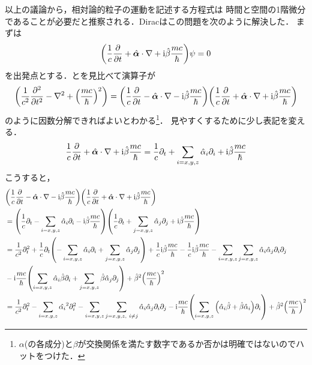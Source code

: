 \documentclass{report}
\begin{document}
以上の議論から，相対論的粒子の運動を記述する方程式は
時間と空間の1階微分であることが必要だと推察される．Diracはこの問題を次のように解決した．
まずは
\begin{align}
  \qty(\frac{1}{c}\frac{\partial}{\partial t} + \hat{\bm{\alpha}} \cdot \nabla + \mathrm{i}\hat{\beta} \frac{mc}{\hbar})\psi = 0 \label{Dirac-pre}
\end{align}
を出発点とする．とを見比べて演算子が
\begin{align}
  \qty(\frac{1}{c^2}\frac{\partial^2}{\partial t^2} - \nabla^2 + \qty(\frac{mc}{\hbar})^2) = \qty(\frac{1}{c}\frac{\partial}{\partial t} - \hat{\bm{\alpha}} \cdot \nabla - \mathrm{i}\hat{\beta} \frac{mc}{\hbar})\qty(\frac{1}{c}\frac{\partial}{\partial t} + \hat{\bm{\alpha}} \cdot \nabla + \mathrm{i}\hat{\beta} \frac{mc}{\hbar})
\end{align}
のように因数分解できればよいとわかる\footnote{$\alpha$(の各成分)と$\beta$が交換関係を満たす数字であるか否かは明確ではないのでハットをつけた．}．
見やすくするために少し表記を変える．
\begin{align}
  \frac{1}{c}\frac{\partial}{\partial t} + \hat{\bm{\alpha}} \cdot \nabla + \mathrm{i}\hat{\beta} \frac{mc}{\hbar} = \frac{1}{c}\partial_t + \sum_{i=x,y,z} \hat{\alpha}_i \partial_i + \mathrm{i}\hat{\beta} \frac{mc}{\hbar}
\end{align}
こうすると，
\begin{align}
  &\qty(\frac{1}{c}\frac{\partial}{\partial t} - \hat{\bm{\alpha}} \cdot \nabla - \mathrm{i}\hat{\beta} \frac{mc}{\hbar})\qty(\frac{1}{c}\frac{\partial}{\partial t} + \hat{\bm{\alpha}} \cdot \nabla + \mathrm{i}\hat{\beta} \frac{mc}{\hbar}) \\
  &=\qty(\frac{1}{c}\partial_t - \sum_{i=x,y,z} \hat{\alpha}_i \partial_i - \mathrm{i}\hat{\beta} \frac{mc}{\hbar}) \qty(\frac{1}{c}\partial_t + \sum_{j=x,y,z} \hat{\alpha}_j \partial_j + \mathrm{i}\hat{\beta} \frac{mc}{\hbar})\\
  &= \frac{1}{c^2}\partial_t^2 + \frac{1}{c} \partial_t \qty(-\sum_{i=x,y,z} \hat{\alpha}_i \partial_i + \sum_{j = x,y,z} \hat{\alpha}_j \partial_j) + \frac{1}{c}\mathrm{i}\hat{\beta}\frac{mc}{\hbar} - \frac{1}{c}\mathrm{i}\hat{\beta}\frac{mc}{\hbar} 
  - \sum_{i=x,y,z} \sum_{j=x,y,z} \hat{\alpha}_i \hat{\alpha}_j \partial_i \partial_j\\ 
  &-\mathrm{i}\frac{mc}{\hbar}\qty(\sum_{i=x,y,z} \hat{\alpha}_i \hat{\beta} \partial_i + \sum_{j=x,y,z} \hat{\beta} \hat{\alpha}_j \partial_j)
  + \hat{\beta}^2\qty(\frac{mc}{\hbar})^2\\
  &= \frac{1}{c^2}\partial_t^2 - \sum_{i=x,y,z} \hat{\alpha_i}^2 \partial_i^2 - \sum_{i=x,y,z} \sum_{j=x,y,z,\ i \neq j} \hat{\alpha}_i \hat{\alpha}_j \partial_i \partial_j
  -\mathrm{i}\frac{mc}{\hbar}\qty(\sum_{i=x,y,z} \qty( \hat{\alpha}_i \hat{\beta} + \hat{\beta} \hat{\alpha}_i )\partial_i) + \hat{\beta}^2\qty(\frac{mc}{\hbar})^2
\end{align}
\end{document}
